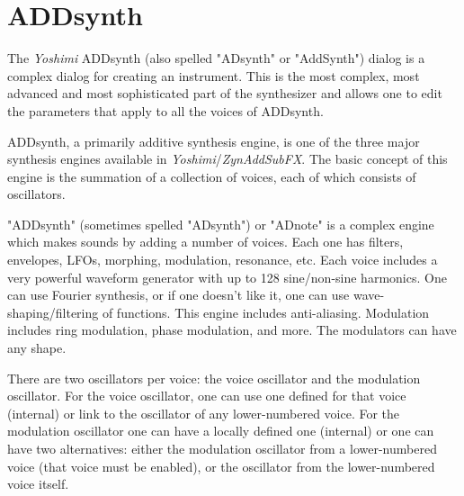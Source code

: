 %
%
%

\section{ADDsynth}
\label{sec:addsynth}

   The \textsl{Yoshimi} ADDsynth (also spelled "ADsynth" or "AddSynth")
   dialog is a complex dialog for creating an
   instrument.  This is the most complex, most advanced and most
   sophisticated part of the synthesizer and allows one to edit the
   parameters that apply to all the voices of ADDsynth.

   ADDsynth, a primarily additive synthesis engine, is one of the three major
   synthesis engines available in \textsl{Yoshimi}/\textsl{ZynAddSubFX}.
   The basic concept of this engine is the summation of a collection of voices,
   each of which consists of oscillators.

   "ADDsynth" (sometimes spelled "ADsynth") or "ADnote" is a complex engine
   which makes sounds by adding a number of voices. Each one has filters,
   envelopes, LFOs, morphing, modulation, resonance, etc.
   Each voice includes a very powerful
   waveform generator with up to 128 sine/non-sine harmonics. One can use
   Fourier synthesis, or if one doesn't like it, one can use
   wave-shaping/filtering of functions. This engine includes anti-aliasing.
   Modulation includes ring modulation, phase modulation, and more.
   The modulators can have any shape.
   \cite{zyndoc}

   There are two oscillators per voice: the  voice
   oscillator and the  modulation oscillator.
   For the voice oscillator, one can use one defined for that voice (internal)
   or link to the oscillator of any lower-numbered voice.  For the modulation
   oscillator one can have a locally defined one (internal) or one can have
   two alternatives: either the modulation oscillator from a lower-numbered
   voice (that voice must be enabled), or the oscillator from the lower-numbered
   voice itself.

